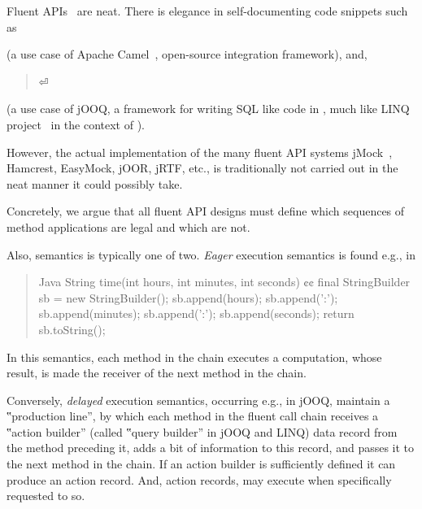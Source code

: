 Fluent APIs~\cite{VanDeursen:Klint:2000,Hudak:1997,Fowler:2010} are
neat. There is elegance in self-documenting code snippets such as
\begin{quote}
  \label{figure:DSL}
  \parbox[c]{44ex}{}
\end{quote}
(a use case of Apache Camel~\cite{Ibsen:Anstey:10}, open-source integration
framework), and,
\begin{quote}
  \parbox[c]{53ex}{}⏎
\end{quote}
(a use case of jOOQ, a framework for writing
SQL like code in \Java, much like LINQ project~\cite{Meijer:Beckman:Bierman:06}
in the context of \CSharp).

However, the actual implementation of the many fluent API systems
jMock~\cite{Freeman:Pryce:06},
Hamcrest,
EasyMock,
jOOR,
jRTF,
etc., is traditionally not carried out
in the neat manner it could possibly take.

Concretely, we argue that all fluent API designs
must define which sequences of method applications are legal
and which are not.

Also, semantics is typically one of two. 
\emph{Eager} execution semantics is
found e.g., in 

\begin{quote}
\begin{lcode}[minipage,width=52ex,box align=center]{Java}
String time(int hours, int minutes, int seconds) {¢¢
  final StringBuilder sb = new StringBuilder();
  sb.append(hours);
  sb.append(':');
  sb.append(minutes);
  sb.append(':');
  sb.append(seconds);
  return sb.toString();
}\end{lcode}
\end{quote}

In this semantics, each method in the chain executes a computation,
  whose result, is made the receiver of the next method
  in the chain.

Conversely, \emph{delayed} execution semantics, occurring e.g., in jOOQ,
  maintain a ‟production line”,
  by which each method in the fluent call chain receives a
  ‟action builder” (called ‟query builder” in jOOQ and LINQ)
  data record from the method preceding it, adds a bit of
  information to this record, and passes it to the next method
  in the chain.
If an action builder is sufficiently defined it can
  produce an action record.
And, action records, may execute
  when specifically requested to so.

